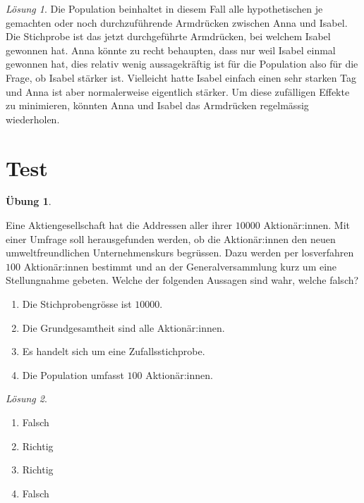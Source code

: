 \documentclass[
]{book}
\providecommand{\tightlist}{%
  \setlength{\itemsep}{0pt}\setlength{\parskip}{0pt}}
\theoremstyle{definition}
\theoremstyle{definition}
\theoremstyle{definition}
\newtheorem{exercise}{Übung}[chapter]
\theoremstyle{definition}
\theoremstyle{remark}
\newtheorem*{solution}{Lösung}
\begin{document}
\begin{solution}
Die Population beinhaltet in diesem Fall alle hypothetischen je gemachten oder noch durchzuführende Armdrücken zwischen Anna und Isabel. Die Stichprobe ist das jetzt durchgeführte Armdrücken, bei welchem Isabel gewonnen hat. Anna könnte zu recht behaupten, dass nur weil Isabel einmal gewonnen hat, dies relativ wenig aussagekräftig ist für die Population also für die Frage, ob Isabel stärker ist. Vielleicht hatte Isabel einfach einen sehr starken Tag und Anna ist aber normalerweise eigentlich stärker. Um diese zufälligen Effekte zu minimieren, könnten Anna und Isabel das Armdrücken regelmässig wiederholen.
\end{solution}

\section{Test}\label{test}

\begin{exercise}
\protect\hypertarget{exr:tagname-apwioev}{}\label{exr:tagname-apwioev}\leavevmode

Eine Aktiengesellschaft hat die Addressen aller ihrer \(10000\) Aktionär:innen. Mit einer Umfrage soll herausgefunden werden, ob die Aktionär:innen den neuen umweltfreundlichen Unternehmenskurs begrüssen. Dazu werden per losverfahren \(100\) Aktionär:innen bestimmt und an der Generalversammlung kurz um eine Stellungnahme gebeten. Welche der folgenden Aussagen sind wahr, welche falsch?

\begin{enumerate}
\def\labelenumi{\alph{enumi})}
\tightlist
\item
  Die Stichprobengrösse ist \(10000\).
\item
  Die Grundgesamtheit sind alle Aktionär:innen.
\item
  Es handelt sich um eine Zufallsstichprobe.
\item
  Die Population umfasst \(100\) Aktionär:innen.
\end{enumerate}

\end{exercise}

\begin{solution}
\leavevmode

\begin{enumerate}
\def\labelenumi{\alph{enumi})}
\tightlist
\item
  Falsch
\item
  Richtig
\item
  Richtig
\item
  Falsch
\end{enumerate}

\end{solution}
\end{document}
